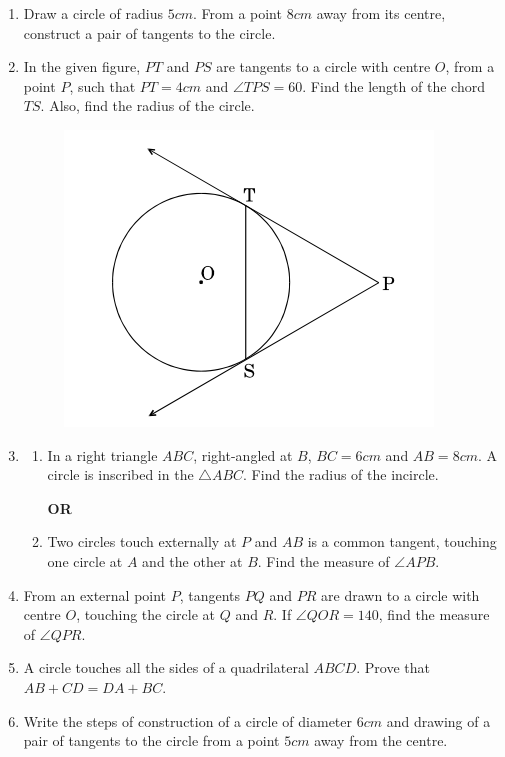 \documentclass{article}
\begin{document}
\begin{enumerate}
\begin{figure}[h]
			\label{fig:my_label}
		\end{figure}
	\item Draw a circle of radius $5 cm$. From a point $8 cm$ away from its centre, construct a pair of tangents to the circle.
	\item In the given figure, $PT$ and $PS$ are tangents to a circle with centre $O$, from a point $P$, such that $PT = 4 cm$ and $\angle TPS = 60$\degree. Find the length of the chord $TS$. Also, find the radius of the circle.
		\begin{figure}[H]
			\centering
			\includegraphics[width=\columnwidth]{fig3.png}
			\label{fig:my_label}
		\end{figure}
	\item \begin{enumerate}[label=(\alph*)]
			\item In a right triangle $ABC$, right-angled at $B$, $BC = 6 cm$ and $AB = 8 cm$. A circle is inscribed in the $\triangle ABC$. Find the radius of the incircle.
			\begin{center}
				\textbf{OR}
			\end{center}
			\item Two circles touch externally at $P$ and $AB$ is a common tangent, touching one circle at $A$ and the other at $B$. Find the measure of $\angle APB$.
		\end{enumerate}
	\item From an external point $P$, tangents $PQ$ and $PR$ are drawn to a circle with centre $O$, touching the circle at $Q$ and $R$. If $\angle QOR = 140$\degree, find the measure of $\angle QPR$.
	\item A circle touches all the sides of a quadrilateral $ABCD$. Prove that $AB + CD = DA + BC$.
	\item Write the steps of construction of a circle of diameter $6 cm$ and drawing of a pair of tangents to the circle from a point $5 cm$ away from the centre.
\end{enumerate}
\end{document}
